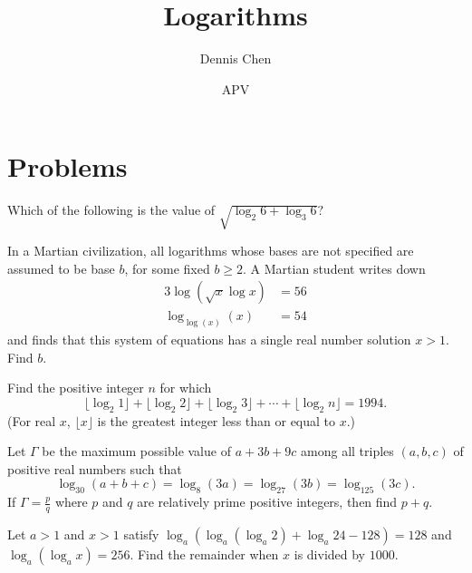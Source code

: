 \documentclass{article}
\title{Logarithms}
\author{Dennis Chen}
\date{APV}
\begin{document}
\maketitle



\pagebreak

\section{Problems}



\begin{req}[AMC 12B 2020/13]{4}
Which of the following is the value of $\sqrt{\log_2{6}+\log_3{6}}?$

\end{req}

\begin{prob}[AIME II 2019/6]{4}
In a Martian civilization, all logarithms whose bases are not specified are assumed to be base $b$, for some fixed $b \geq 2$. A Martian student writes down\begin{align*}3 \log(\sqrt{x}\log x) &= 56\\\log_{\log (x)}(x) &= 54\end{align*}and finds that this system of equations has a single real number solution $x > 1$. Find $b$.
\end{prob}

\begin{prob}[AIME 1994/4]{4}
Find the positive integer $n$ for which \[ \lfloor \log_2{1}\rfloor+\lfloor\log_2{2}\rfloor+\lfloor\log_2{3}\rfloor+\cdots+\lfloor\log_2{n}\rfloor=1994.  \]  (For real $x$, $\lfloor x\rfloor$ is the greatest integer less than or equal to $x$.)
\end{prob}

\begin{prob}{6}
Let $\Gamma$ be the maximum possible value of $a+3b+9c$ among all triples $(a,b,c)$ of positive real numbers such that
\[ \log_{30}(a+b+c) = \log_{8}(3a) = \log_{27} (3b) = \log_{125} (3c) .\]If $\Gamma = \frac{p}{q}$ where $p$ and $q$ are relatively prime positive integers, then find $p+q$.
\end{prob}

\begin{prob}[AIME I 2017/14]{9}
Let $a > 1$ and $x > 1$ satisfy $\log_a(\log_a(\log_a 2) + \log_a 24 - 128) = 128$ and $\log_a(\log_a x) = 256$. Find the remainder when $x$ is divided by $1000$.
\end{prob}
\end{document}
